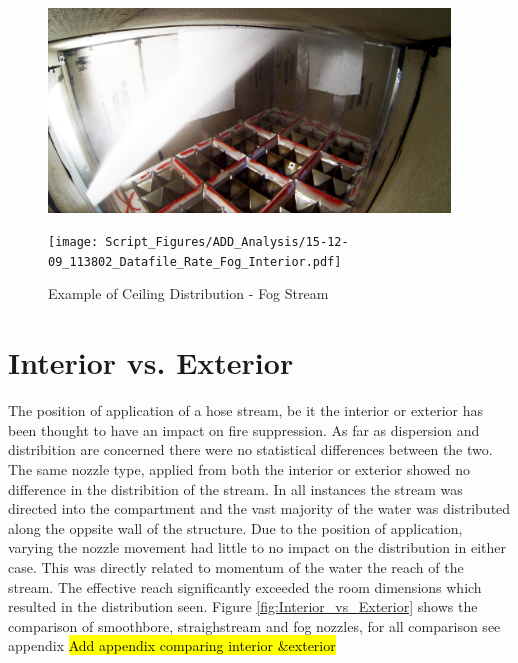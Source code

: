 \documentclass[12pt,oneside]{book}
\begin{document}
\begin{figure}[H]
	\centering
	\begin{minipage}[b]{0.45\textwidth}
	\centering
	\includegraphics[width=0.95\textwidth]{Figures/Water_Distribution/Nozzle_Directions/Interior_MidCeiling_Fog.png}
	\end{minipage}
	\begin{minipage}[b]{0.45\textwidth}
	\centering
	\texttt{[image: Script\_Figures/ADD\_Analysis/15-12-09\_113802\_Datafile\_Rate\_Fog\_Interior.pdf]}
	\end{minipage}
	\caption{Example of Ceiling Distribution - Fog Stream}
	\label{fig:Interior_Fog_MidCeiling}
\end{figure}

\section{Interior vs. Exterior}
The position of application of a hose stream, be it the interior or exterior has been thought to have an impact on fire suppression. As far as dispersion and distribition are concerned there were no statistical differences between the two. The same nozzle type, applied from both the interior or exterior showed no difference in the distribition of the stream. In all instances the stream was directed into the compartment and the vast majority of the water was distributed along the oppsite wall of the structure. Due to the position of application, varying the nozzle movement had little to no impact on the distribution in either case. This was directly related to momentum of the water the reach of the stream. The effective reach significantly exceeded the room dimensions which resulted in the distribution seen. Figure \ref{fig:Interior_vs_Exterior} shows the comparison of smoothbore, straighstream and fog nozzles, for all comparison see appendix \hl{Add appendix comparing interior \&exterior}
\end{document}
